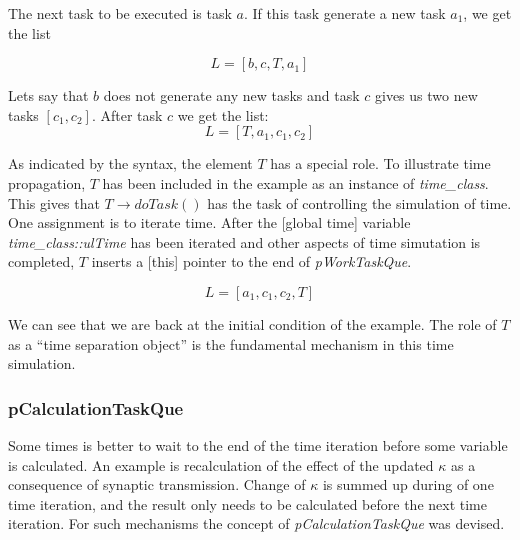 	The next task to be executed is task $a$.
	If this task generate a new task $a_1$, we get the list



\begin{equation}
	\nonumber
	L = [b, c, T, a_1]
\end{equation}

Lets say that $b$ does not generate any new tasks and task $c$ gives us two new tasks $[c_1, c_2]$. After task $c$ we get the list:
\begin{equation}
	\nonumber
	L = [T, a_1, c_1, c_2 ]
\end{equation}

As indicated by the syntax, the element $T$ has a special role.
To illustrate time propagation, $T$ has been included in the example as an instance of \emph{time\_class}.
This gives that $T\rightarrow doTask()$ has the task of controlling the simulation of time. 
One assignment is to iterate time.
After the [global time] variable \emph{time\_class::ulTime} has been iterated and other aspects of time simutation is completed, $T$ inserts a [this] pointer to the end of \emph{pWorkTaskQue}.


\begin{equation}
	\nonumber
	L = [a_1, c_1, c_2, T ]
\end{equation}

We can see that we are back at the initial condition of the example.
The role of $T$ as a ``time separation object'' is the fundamental mechanism in this time simulation.




\subsubsection{pCalculationTaskQue}
\label{ssecCalcultaionTaskQue} %
Some times is better to wait to the end of the time iteration before some variable is calculated.  %
An example is recalculation of the effect of the updated $\kappa$ as a consequence of synaptic transmission. 
Change of $\kappa$ is summed up during of one time iteration, and the result only needs to be calculated before the next time iteration.
For such mechanisms the concept of \emph{pCalculationTaskQue} was devised.

